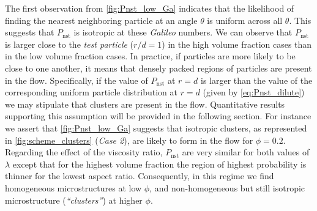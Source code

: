 The first observation from \ref{fig:Pnst_low_Ga} indicates that the likelihood of finding the nearest neighboring particle at an angle $\theta$ is uniform across all $\theta$.
This suggests that $P_\text{nst}$ is isotropic at these \textit{Galileo} numbers. We can observe that $P_\text{nst}$ is larger close to the \textit{test particle} ($r/d = 1$) in the high volume fraction cases than in the low volume fraction cases.
In practice, if particles are more likely to be close to one another, it means that densely packed regions of particles are present in the flow.
Specifically, if the value of $P_\text{nst}$ at $r=d$ is larger than the value of the corresponding uniform particle distribution at $r=d$ (given by \ref{eq:Pnst_dilute}) we may stipulate that clusters are present in the flow. 
Quantitative results supporting this assumption will be provided in the following section. 
For instance we assert that \ref{fig:Pnst_low_Ga} suggests that isotropic clusters, as represented in \ref{fig:scheme_clusters} (\textit{Case 2}), are likely to form in the flow for $\phi = 0.2$. 
Regarding the effect of the viscosity ratio, $P_\text{nst}$ are very similar for both values of $\lambda$ except that for the highest volume fraction the region of highest probability is thinner for the lowest aspect ratio. 
Consequently, in this regime we find homogeneous microstructures at low $\phi$, and non-homogeneous but still isotropic microstructure (\textit{``clusters''}) at higher $\phi$. 

